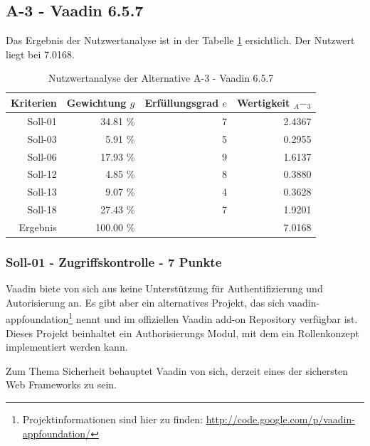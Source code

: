   \subsection{A-3 - Vaadin 6.5.7}
  
  Das Ergebnis der Nutzwertanalyse ist in der Tabelle \ref{tab:nwaA3}
  ersichtlich. Der Nutzwert liegt bei 7.0168.
    
  \begin{table}[ht]
    \sffamily 
    \begin{center}
      \begin{tabular}{r|rrr}
        \toprule
        Kriterien & Gewichtung \(g\) & Erfüllungsgrad \(e\) & Wertigkeit
        \(_A-_3\) \\
        \midrule
        Soll-01   & 34.81 \% & 7 & 2.4367 \\
        Soll-03   &  5.91 \% & 5 & 0.2955 \\
        Soll-06   & 17.93 \% & 9 & 1.6137 \\
        Soll-12   &  4.85 \% & 8 & 0.3880 \\
        Soll-13   &  9.07 \% & 4 & 0.3628 \\
        Soll-18   & 27.43 \% & 7 & 1.9201 \\
        \midrule
        \midrule
        Ergebnis  & 100.00 \% &   & 7.0168 \\
        \bottomrule
      \end{tabular}
      \caption{Nutzwertanalyse der Alternative A-3 - Vaadin 6.5.7}
      \label{tab:nwaA3}
    \end{center}
  \end{table}
  
  \subsubsection{Soll-01 - Zugriffskontrolle - 7 Punkte}
  
  Vaadin biete von sich aus keine Unterstützung für Authentifizierung und
  Autorisierung an. Es gibt aber ein alternatives Projekt, das sich
  vaadin-appfoundation\footnote{Projektinformationen sind hier zu finden:
  \url{http://code.google.com/p/vaadin-appfoundation/}} nennt und im
  offiziellen Vaadin add-on Repository verfügbar ist. Dieses Projekt beinhaltet
  ein Authorisierungs Modul, mit dem ein Rollenkonzept implementiert werden kann.
  
  Zum Thema Sicherheit behauptet Vaadin von sich, derzeit eines der sichersten
  Web Frameworks zu sein.
  \newline
  
